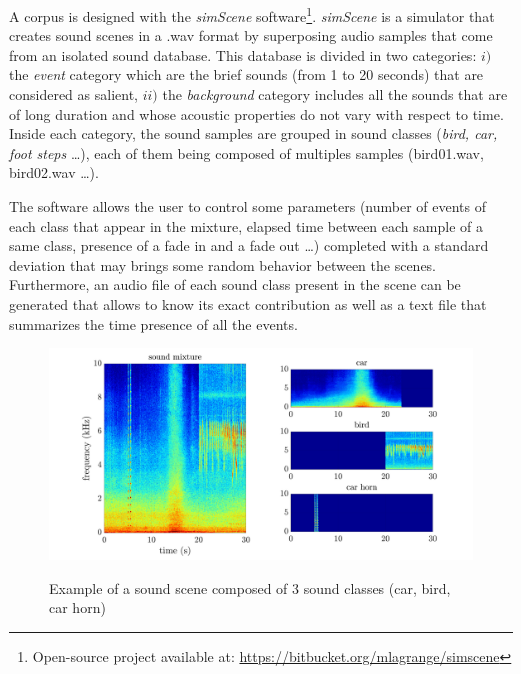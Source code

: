 \documentclass[twocolumn,a4paper,10pt]{article}
\begin{document}
A corpus is designed with the \textit{simScene} software\footnote{Open-source project available at: \url{https://bitbucket.org/mlagrange/simscene}}. \textit{simScene} \cite{rossignol_simscene:_2015} is a simulator that creates sound scenes in a .wav format by superposing audio samples that come from an isolated sound database. This database is divided in two categories: $i)$ the \textit{event} category which are the brief sounds (from 1 to 20 seconds) that are considered as salient, $ii)$ the \textit{background} category includes all the sounds that are of long duration and whose acoustic properties do not vary with respect to time. Inside each category, the sound samples are grouped in sound classes (\textit{bird, car, foot steps} \dots), each of them being composed of multiples samples (bird01.wav, bird02.wav \dots).

The software allows the user to control some parameters (number of events of each class that appear in the mixture, elapsed time between each sample of a same class, presence of a fade in and a fade out \dots) completed with a standard deviation that may brings some random behavior between the scenes. Furthermore, an audio file of each sound class present in the scene can be generated that allows to know its exact contribution as well as a text file that summarizes the time presence of all the events.\\

\begin{figure}[h]
\centering
\includegraphics[width=\linewidth]{../image/exampleSimScene2.pdf}
\label{fig:exampleSimScene}
\caption{Example of a sound scene composed of 3 sound classes (car, bird, car horn)}
\end{figure}
\end{document}
